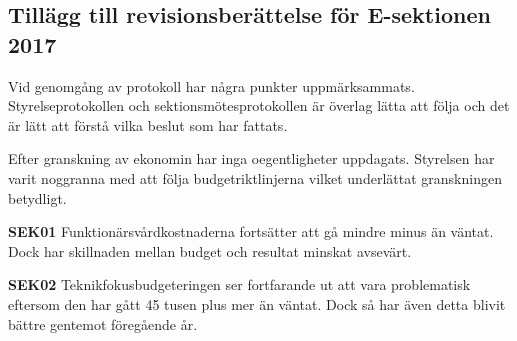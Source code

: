 \documentclass[../_main/handlingar.tex]{subfiles}
\begin{document}
\subsection{Tillägg till revisionsberättelse för E-sektionen 2017}

Vid genomgång av protokoll har några punkter uppmärksammats. Styrelseprotokollen och sektionsmötesprotokollen är överlag
lätta att följa och det är lätt att förstå vilka beslut som har fattats. 

Efter granskning av ekonomin har inga oegentligheter uppdagats. Styrelsen har varit noggranna med att följa budgetriktlinjerna vilket underlättat granskningen betydligt. 

\textbf{SEK01} Funktionärsvårdkostnaderna fortsätter att gå mindre minus än väntat. Dock har skillnaden mellan budget och resultat minskat avsevärt.

\textbf{SEK02} Teknikfokusbudgeteringen ser fortfarande ut att vara problematisk eftersom den har gått 45 tusen plus mer än väntat. Dock så har även detta blivit bättre gentemot föregående år. 
\end{document}
